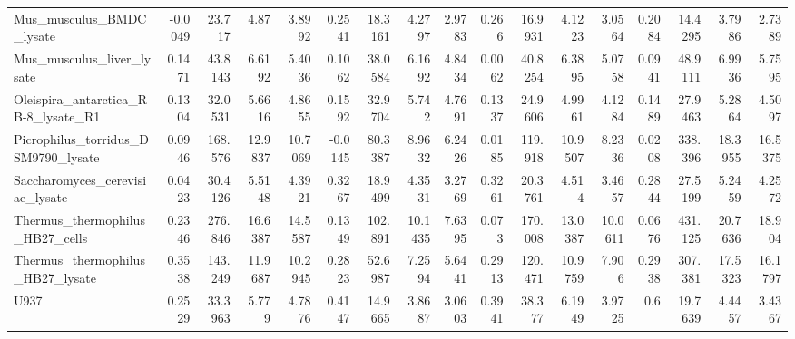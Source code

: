 \begin{tabular}{lrrrrrrrrrrrrrrrr}
 Mus\_musculus\_BMDC\_lysate                    &             -0.0049   &          23.717  &           4.87    &          3.8992  &         0.2541   &     18.3161 &      4.2797  &     2.9783  &        0.266   &   16.9931 &    4.1223  &   3.0564  &         0.2084   &     14.4295 &      3.7986  &      2.7389 \\
 Mus\_musculus\_liver\_lysate                   &              0.1471   &          43.8143 &           6.6192  &          5.4036  &         0.1062   &     38.0584 &      6.1692  &     4.8434  &        0.0062  &   40.8254 &    6.3895  &   5.0758  &         0.0941   &     48.9111 &      6.9936  &      5.7595 \\
 Oleispira\_antarctica\_RB-8\_lysate\_R1         &              0.1304   &          32.0531 &           5.6616  &          4.8655  &         0.1592   &     32.9704 &      5.742   &     4.7691  &        0.1337  &   24.9606 &    4.9961  &   4.1284  &         0.1489   &     27.9463 &      5.2864  &      4.5097 \\
 Picrophilus\_torridus\_DSM9790\_lysate         &              0.0946   &         168.576  &          12.9837  &         10.7069  &        -0.0145   &     80.3387 &      8.9632  &     6.2426  &        0.0185  &  119.918  &   10.9507  &   8.2336  &         0.0208   &    338.396  &     18.3955  &     16.5375 \\
 Saccharomyces\_cerevisiae\_lysate             &              0.0423   &          30.4126 &           5.5148  &          4.3921  &         0.3267   &     18.9499 &      4.3531  &     3.2769  &        0.3261  &   20.3761 &    4.514   &   3.4657  &         0.2844   &     27.5199 &      5.2459  &      4.2572 \\
 Thermus\_thermophilus\_HB27\_cells             &              0.2346   &         276.846  &          16.6387  &         14.5587  &         0.1349   &    102.891  &     10.1435  &     7.6395  &        0.073   &  170.008  &   13.0387  &  10.0611  &         0.0676   &    431.125  &     20.7636  &     18.904  \\
 Thermus\_thermophilus\_HB27\_lysate            &              0.3538   &         143.249  &          11.9687  &         10.2945  &         0.2823   &     52.6987 &      7.2594  &     5.6441  &        0.2913  &  120.471  &   10.9759  &   7.906   &         0.2938   &    307.381  &     17.5323  &     16.1797 \\
 U937                                        &              0.2529   &          33.3963 &           5.779   &          4.7876  &         0.4147   &     14.9665 &      3.8687  &     3.0603  &        0.3941  &   38.377  &    6.1949  &   3.9725  &         0.6      &     19.7639 &      4.4457  &      3.4367 \\

\end{tabular}
